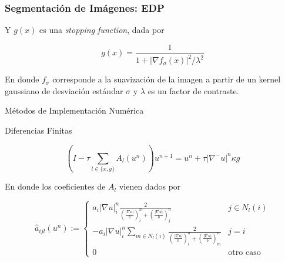 \documentclass{beamer}
\begin{document}
\begin{frame}
\frametitle{Segmentación de Imágenes: EDP}
Y $g(x)$ es una \textit{stopping function}, dada por

\begin{equation*}
    g(x) = \frac{1}{1+|\nabla f_{\sigma}(x)|^2/\lambda^2}
\end{equation*}

En donde $f_{\sigma}$ corresponde a la suavización de la imagen a partir de un kernel gaussiano de desviación estándar $\sigma$ y $\lambda$ es un factor de contraste.

\end{frame}

\begin{frame}{Métodos de Implementación Numérica}

Diferencias Finitas

\begin{equation*}
    \left( I - \tau \sum_{l \in \{x,y\}} A_l(u^n)\right)u^{n+1} = u^n + \tau|\nabla^-u|^n\kappa g
\end{equation*}
    
En donde los coeficientes de $A_l$ vienen dados por
    
\begin{equation*}
    \hat{a}_{ijl}(u^n):=
    \begin{cases}
    a_i|\nabla u|_i^n \frac{2}{\left(\frac{|\nabla u|}{b} \right)_i^n+\left(\frac{|\nabla u|}{b} \right)_j^n} & j \in N_l(i)\\
    -a_i|\nabla u|_i^n \sum\limits_{m \in N_l(i)} \frac{2}{\left(\frac{|\nabla u|}{b} \right)_i^n+\left(\frac{|\nabla u|}{b} \right)_m^n} & j=i\\
    0 & \text{otro caso}
    \end{cases}
\end{equation*}    
    
\end{frame}
\end{document}
